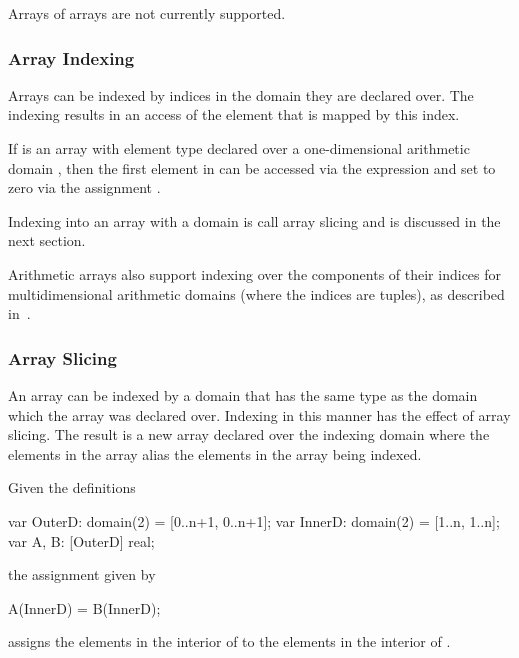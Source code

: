 \begin{status}
Arrays of arrays are not currently supported.
\end{status}

\subsubsection{Array Indexing}
\label{Array_Indexing}

Arrays can be indexed by indices in the domain they are declared over.
The indexing results in an access of the element that is mapped by
this index.

\begin{example}
If  is an array with element type  declared over a
one-dimensional arithmetic domain \chpl{[1..n]}, then the first
element in  can be accessed via the expression  and
set to zero via the assignment .
\end{example}

Indexing into an array with a domain is call array slicing and is
discussed in the next section.

Arithmetic arrays also support indexing over the components of their
indices for multidimensional arithmetic domains (where the indices are
tuples), as described in~.

\subsubsection{Array Slicing}
\label{Array_Slicing}

An array can be indexed by a domain that has the same type as the
domain which the array was declared over.  Indexing in this manner has
the effect of array slicing.  The result is a new array declared over
the indexing domain where the elements in the array alias the elements
in the array being indexed.

\begin{example}
Given the definitions
\begin{chapel}
var OuterD: domain(2) = [0..n+1, 0..n+1];
var InnerD: domain(2) = [1..n, 1..n];
var A, B: [OuterD] real;
\end{chapel}
the assignment given by
\begin{chapel}
A(InnerD) = B(InnerD);
\end{chapel}
assigns the elements in the interior of  to the elements in
the interior of .
\end{example}

